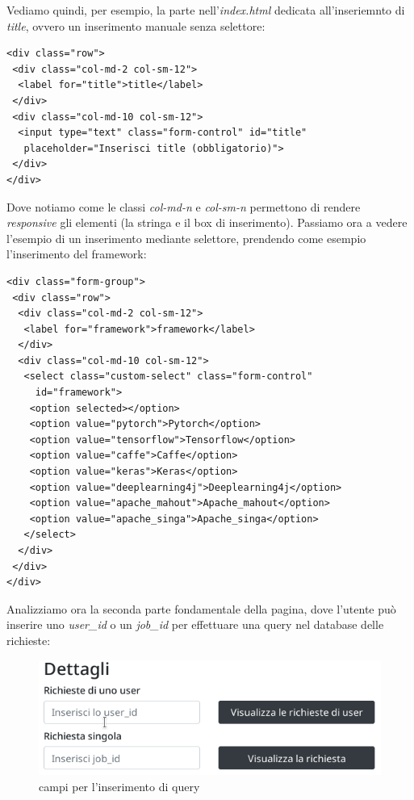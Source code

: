 \documentclass[a4paper,12pt, oneside]{book}
\begin{document}
Vediamo quindi, per esempio, la parte nell'\textit{index.html} dedicata all'inseriemnto di \textit{title}, ovvero un inserimento manuale senza selettore:
\begin{shaded}
\begin{verbatim}
<div class="row">
 <div class="col-md-2 col-sm-12">
  <label for="title">title</label>
 </div>
 <div class="col-md-10 col-sm-12">
  <input type="text" class="form-control" id="title"
   placeholder="Inserisci title (obbligatorio)">
 </div>
</div>
\end{verbatim}
\end{shaded}
Dove notiamo come le classi \textit{col-md-n} e \textit{col-sm-n} permettono di rendere \textit{responsive} gli elementi (la stringa e il box di inserimento).
\newpage
Passiamo ora a vedere l'esempio di un inserimento mediante selettore, prendendo come esempio
l'inserimento del framework:
\begin{shaded}
\begin{verbatim}
<div class="form-group">
 <div class="row">
  <div class="col-md-2 col-sm-12">
   <label for="framework">framework</label>
  </div>
  <div class="col-md-10 col-sm-12">
   <select class="custom-select" class="form-control"
     id="framework">
    <option selected></option>
    <option value="pytorch">Pytorch</option>
    <option value="tensorflow">Tensorflow</option>
    <option value="caffe">Caffe</option>
    <option value="keras">Keras</option>
    <option value="deeplearning4j">Deeplearning4j</option>
    <option value="apache_mahout">Apache_mahout</option>
    <option value="apache_singa">Apache_singa</option>
   </select>
  </div>
 </div>
</div>
\end{verbatim}
\end{shaded}
Analizziamo ora la seconda parte fondamentale della pagina, dove l'utente può
inserire uno \textit{user\_id} o un \textit{job\_id} per effettuare una query nel database
delle richieste:
\begin{figure}[H]
  \centering
  \includegraphics[scale = 0.8]{img/query.png}
  \caption{campi per l'inserimento di query}
\end{figure}
\end{document}
